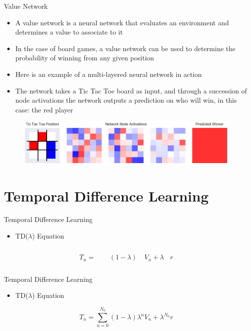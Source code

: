 \begin{frame}[plain]{Value Network}
\begin{itemize}
\item A value network is a neural network that evaluates an environment and determines a value to associate to it
\item In the case of board games, a value network can be used to determine the probability of winning from any given position
\item Here is an example of a multi-layered neural network in action
\item The network takes a Tic Tac Toe board as input, and through a succession of node activations the network outputs a prediction on who will win, in this case: the red player
\end{itemize}
\begin{figure}
\includegraphics[width=1. \textwidth]{network_weights}
\end{figure}
\end{frame}

\section{Temporal Difference Learning}

\begin{frame}{Temporal Difference Learning}
\begin{itemize}
\item TD($\lambda$) Equation
\end{itemize}
\begin{equation*}
T_n = \phantom{\sum_{n=0}^{N_0} }(1-\lambda)\phantom{\lambda^n} V_n + \lambda^{\phantom{N_0}} r
\end{equation*}
\end{frame}

\begin{frame}{Temporal Difference Learning}
\begin{itemize}
\item TD($\lambda$) Equation
\end{itemize}
\begin{equation*}
T_n = \sum_{n=0}^{N_0} (1-\lambda)\lambda^n V_n + \lambda^{N_0} r
\end{equation*}
\end{frame}
